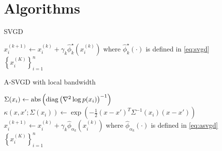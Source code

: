 





\section{Algorithms}

\begin{algorithm}[H] 
    \caption{SVGD} \label{alg:SVGD} 
\begin{algorithmic}
        \State $x_{i}^{(k+1)} \leftarrow x_{i}^{(k)}+ \gamma_k \hat{\phi}_k^{\star}\left(x_{i}^{(k)}\right)$ where $\hat{\phi}_k^{\star}(\cdot)$ is defined in \cref{eq:svgd}
        \EndFor
    \EndFor
    \State \Return $\left\{x_i^{(K)}  \right\}_{i = 1}^n$ 
   \EndProcedure 
\end{algorithmic}
\end{algorithm}

\begin{algorithm}[H] 
    \caption{A-SVGD with local bandwidth} \label{alg:ASVGD_bw} 
\begin{algorithmic}
        \State $\Sigma(x_i) \gets \text{abs}\left( \operatorname{diag} \left(\nabla^2 \log p(x_i) \right)^{-1}\right)$
        \State $\kappa(x, x'; \Sigma(x_i))\gets \exp\left(-\frac{1}{2}(x - x')^T \Sigma^{-1}(x_i)(x- x')  \right)$
        \State $x_{i}^{(k+1)} \leftarrow x_{i}^{(k)}+ \gamma_k \hat{\phi}_{\alpha_k}\left(x_{i}^{(k)}\right)$ where $\hat{\phi}_{\alpha_k}(\cdot)$ is defined in \cref{eq:asvgd}
        \EndFor
    \EndFor
    \State \Return $\left\{x_i^{(K)}  \right\}_{i = 1}^n$ 
   \EndProcedure 
\end{algorithmic}
\end{algorithm}




